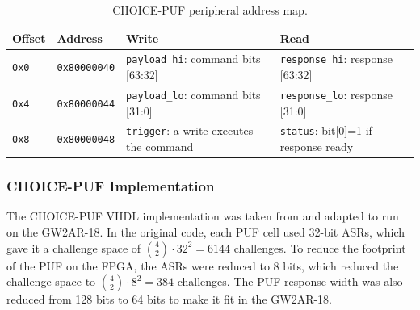 \begin{table}[ht!]
  \centering
  \caption{CHOICE-PUF peripheral address map.}
  \begin{tabular}{llll}
  \hline
  \textbf{Offset} & \textbf{Address} & \textbf{Write} & \textbf{Read} \\
  \hline
  \texttt{0x0} & \texttt{0x80000040} & \texttt{payload\_hi}: command bits [63:32]       & \texttt{response\_hi}: response [63:32] \\
  \texttt{0x4} & \texttt{0x80000044} & \texttt{payload\_lo}: command bits [31:0]         & \texttt{response\_lo}: response [31:0] \\
  \texttt{0x8} & \texttt{0x80000048} & \texttt{trigger}: a write executes the command    & \texttt{status}: bit[0]=1 if response ready \\
  \hline
  \end{tabular}
  \label{tab:puf-regs}
  \end{table}

\subsubsection{CHOICE-PUF Implementation}
The CHOICE-PUF VHDL implementation was taken from \cite{choice_puf_repo} and adapted to run on the GW2AR-18. In the original code, each PUF cell used 32-bit ASRs, which gave it a challenge space of $\binom{4}{2} \cdot 32^2 = 6144$ challenges. To reduce the footprint of the PUF on the FPGA, the ASRs were reduced to 8 bits, which reduced the challenge space to $\binom{4}{2} \cdot 8^2 = 384$ challenges. The PUF response width was also reduced from 128 bits to 64 bits to make it fit in the GW2AR-18.

